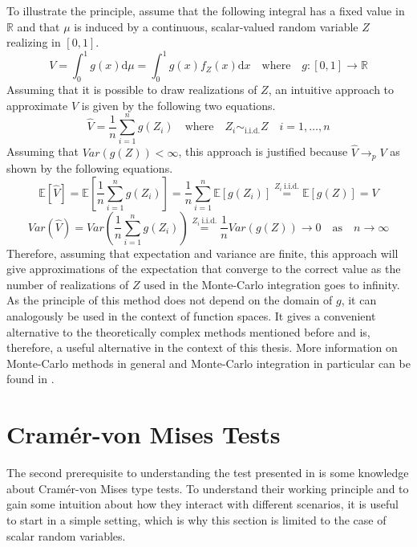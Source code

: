 \documentclass[12pt, a4paper]{article}
\theoremstyle{MAstyle} \newtheorem{assumption}{Assumption}[section]
\theoremstyle{MAstyle} \newtheorem{definition}{Definition}[section]
\theoremstyle{MAstyle} \newtheorem{theorem}{Theorem}[section]
\begin{document}
			To illustrate the principle, assume that the following integral has a fixed value in $\mathbb{R}$ and that $\mu$ is induced by a continuous, scalar-valued random variable $Z$ realizing in $[0,1]$.
			\begin{equation}
				V = \int_{0}^{1} g(x) \mathrm{d}\mu = \int_{0}^{1} g(x) f_Z(x) \mathrm{d}x \quad \text{where} \quad g:[0,1] \rightarrow \mathbb{R}
			\end{equation}
			Assuming that it is possible to draw realizations of $Z$, an intuitive approach to approximate $V$ is given by the following two equations.
			\begin{equation}
				\hat{V} = \frac{1}{n} \sum_{i = 1}^{n} g(Z_i) \quad \text{where} \quad Z_i \sim_{\text{i.i.d.}} Z \quad i = 1, \dots, n
			\end{equation}
			Assuming that $\textit{Var}(g(Z)) < \infty$, this approach is justified because $\hat{V} \rightarrow_p V$ as shown by the following equations.
			\begin{equation}
					\mathbb{E}[\hat{V}] = \mathbb{E}\left[\frac{1}{n}\sum_{i = 1}^{n} g(Z_i)\right] = \frac{1}{n}\sum_{i = 1}^{n}\mathbb{E}\left[g(Z_i)\right] \stackrel{Z_i \ \text{i.i.d.}}{=} \mathbb{E}\left[g(Z)\right] = V
			\end{equation}
			\begin{equation}
				\textit{Var}\left(\hat{V}\right) = \textit{Var}\left(\frac{1}{n}\sum_{i = 1}^{n} g(Z_i)\right) \stackrel{Z_i \ \text{i.i.d.}}{=} 
				\frac{1}{n} \textit{Var}\left(g(Z)\right) \rightarrow 0 \quad \text{as} \quad n \rightarrow \infty
			\end{equation}
			Therefore, assuming that expectation and variance are finite, this approach will give approximations of the expectation that converge to the correct value as the number of realizations of $Z$ used in the Monte-Carlo integration goes to infinity.
			As the principle of this method does not depend on the domain of $g$, it can analogously be used in the context of function spaces. It gives a convenient alternative to the theoretically complex methods mentioned before and is, therefore, a useful alternative in the context of this thesis. More information on Monte-Carlo methods in general and Monte-Carlo integration in particular can be found in \cite{shonkwiler_explorations_2009}.
		
	\section{Cram\'{e}r-von Mises Tests}\label{CvM_Tests}
		The second prerequisite to understanding the test presented in \cite{bugni_permutation_2021} is some knowledge about Cram\'er-von Mises type tests. To understand their working principle and to gain some intuition about how they interact with different scenarios, it is useful to start in a simple setting, which is why this section is limited to the case of scalar random variables.\\
		
\end{document}
